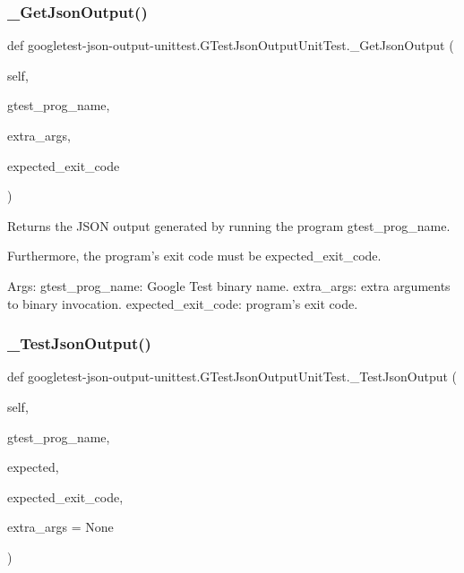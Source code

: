 \subsubsection{\texorpdfstring{\+\_\+\+Get\+Json\+Output()}{\_GetJsonOutput()}}
{\footnotesize\ttfamily def googletest-\/json-\/output-\/unittest.\+G\+Test\+Json\+Output\+Unit\+Test.\+\_\+\+Get\+Json\+Output (\begin{DoxyParamCaption}\item[{}]{self,  }\item[{}]{gtest\+\_\+prog\+\_\+name,  }\item[{}]{extra\+\_\+args,  }\item[{}]{expected\+\_\+exit\+\_\+code }\end{DoxyParamCaption})\hspace{0.3cm}{\ttfamily [private]}}

\begin{DoxyVerb}Returns the JSON output generated by running the program gtest_prog_name.

Furthermore, the program's exit code must be expected_exit_code.

Args:
  gtest_prog_name: Google Test binary name.
  extra_args: extra arguments to binary invocation.
  expected_exit_code: program's exit code.
\end{DoxyVerb}
 \mbox{\label{classgoogletest-json-output-unittest_1_1_g_test_json_output_unit_test_a0145de3211dd5d9e50aa23c8ae9fde5e}} 
\subsubsection{\texorpdfstring{\+\_\+\+Test\+Json\+Output()}{\_TestJsonOutput()}}
{\footnotesize\ttfamily def googletest-\/json-\/output-\/unittest.\+G\+Test\+Json\+Output\+Unit\+Test.\+\_\+\+Test\+Json\+Output (\begin{DoxyParamCaption}\item[{}]{self,  }\item[{}]{gtest\+\_\+prog\+\_\+name,  }\item[{}]{expected,  }\item[{}]{expected\+\_\+exit\+\_\+code,  }\item[{}]{extra\+\_\+args = {\ttfamily None} }\end{DoxyParamCaption})\hspace{0.3cm}{\ttfamily [private]}}

